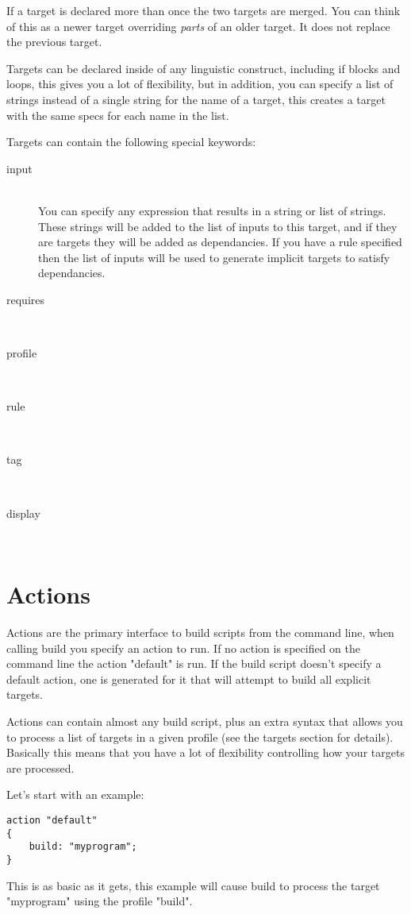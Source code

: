 \documentclass[letterpaper]{book}
\begin{document}
If a target is declared more than once the two targets are merged.  You can
think of this as a newer target overriding \emph{parts} of an older target.  It
does not replace the previous target.

Targets can be declared inside of any linguistic construct, including if blocks
and loops, this gives you a lot of flexibility, but in addition, you can
specify a list of strings instead of a single string for the name of a target,
this creates a target with the same specs for each name in the list.

Targets can contain the following special keywords:

\begin{description}
    \item[input] \hfill \\
    You can specify any expression that results in a string or list of strings.
    These strings will be added to the list of inputs to this target, and if
    they are targets they will be added as dependancies.  If you have a rule
    specified then the list of inputs will be used to generate implicit targets
    to satisfy dependancies.
    \item[requires] \hfill \\
    \item[profile] \hfill \\
    \item[rule] \hfill \\
    \item[tag] \hfill \\
    \item[display] \hfill \\
\end{description}


\section{Actions}
Actions are the primary interface to build scripts from the command line, when
calling build you specify an action to run.  If no action is specified on the
command line the action "default" is run.  If the build script doesn't specify
a default action, one is generated for it that will attempt to build all
explicit targets.

Actions can contain almost any build script, plus an extra syntax that allows
you to process a list of targets in a given profile (see the targets section
for details). Basically this means that you have a lot of flexibility
controlling how your targets are processed.

Let's start with an example:

\begin{lstlisting}
action "default"
{
    build: "myprogram";
}
\end{lstlisting}

This is as basic as it gets, this example will cause build to process the
target "myprogram" using the profile "build".
\end{document}
